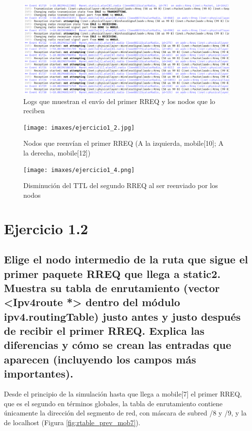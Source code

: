 \begin{figure}[H]
    \centering
    \includegraphics[width=125mm, scale=0.75]{imaxes/ejercicio1_1.png}
    \caption{Logs que muestran el envío del primer RREQ y los nodos que lo reciben}
    \label{fig:primer_rreq_reception}
\end{figure}

\begin{figure}[H]
    \centering
    \texttt{[image: imaxes/ejercicio1\_2.jpg]}
    \caption{Nodos que reenvían el primer RREQ (A la izquierda, mobile[10]; A la derecha, mobile[12])}
    \label{fig:primer_rreq_transmission}
\end{figure}

\begin{figure}[H]
    \centering
    \texttt{[image: imaxes/ejercicio1\_4.png]}
    \caption{Disminución del TTL del segundo RREQ al ser reenviado por los nodos}
    \label{fig:primer_rreq_transmission}
\end{figure}

\vspace{1.25cm}
\section{Ejercicio 1.2}

\subsection{Elige el nodo intermedio de la ruta que sigue el primer paquete RREQ que llega a static2. Muestra su tabla
de enrutamiento (vector <Ipv4route *> dentro del módulo ipv4.routingTable) justo antes y justo después de
recibir el primer RREQ. Explica las diferencias y cómo se crean las entradas que aparecen (incluyendo los campos
más importantes).}

Desde el principio de la simulación hasta que llega a mobile[7] el primer RREQ, que es el segundo en términos globales, la tabla de enrutamiento contiene únicamente la dirección del segmento de red, con máscara de subred /8 y /9, y la de localhost (Figura \ref{fig:rtable_prev_mob7}).


